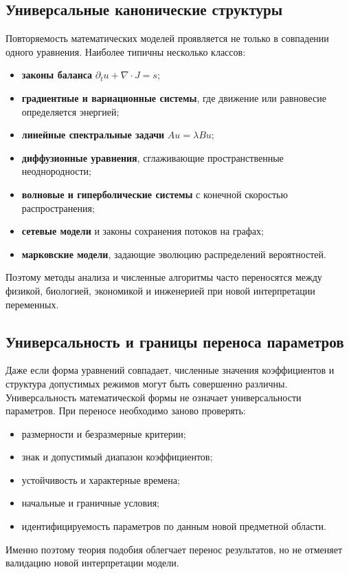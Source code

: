 \subsection{Универсальные канонические структуры}

Повторяемость математических моделей проявляется не только в совпадении одного
уравнения. Наиболее типичны несколько классов:
\begin{itemize}
    \item \textbf{законы баланса}
    $\partial_t u+\nabla\cdot J=s$;
    \item \textbf{градиентные и вариационные системы}, где движение или
    равновесие определяется энергией;
    \item \textbf{линейные спектральные задачи}
    $Au=\lambda Bu$;
    \item \textbf{диффузионные уравнения}, сглаживающие пространственные
    неоднородности;
    \item \textbf{волновые и гиперболические системы} с конечной скоростью
    распространения;
    \item \textbf{сетевые модели} и законы сохранения потоков на графах;
    \item \textbf{марковские модели}, задающие эволюцию распределений
    вероятностей.
\end{itemize}
Поэтому методы анализа и численные алгоритмы часто переносятся между физикой,
биологией, экономикой и инженерией при новой интерпретации переменных.

\subsection{Универсальность и границы переноса параметров}

Даже если форма уравнений совпадает, численные значения коэффициентов и
структура допустимых режимов могут быть совершенно различны. Универсальность
математической формы не означает универсальности параметров. При переносе
необходимо заново проверять:
\begin{itemize}
    \item размерности и безразмерные критерии;
    \item знак и допустимый диапазон коэффициентов;
    \item устойчивость и характерные времена;
    \item начальные и граничные условия;
    \item идентифицируемость параметров по данным новой предметной области.
\end{itemize}
Именно поэтому теория подобия облегчает перенос результатов, но не отменяет
валидацию новой интерпретации модели.

